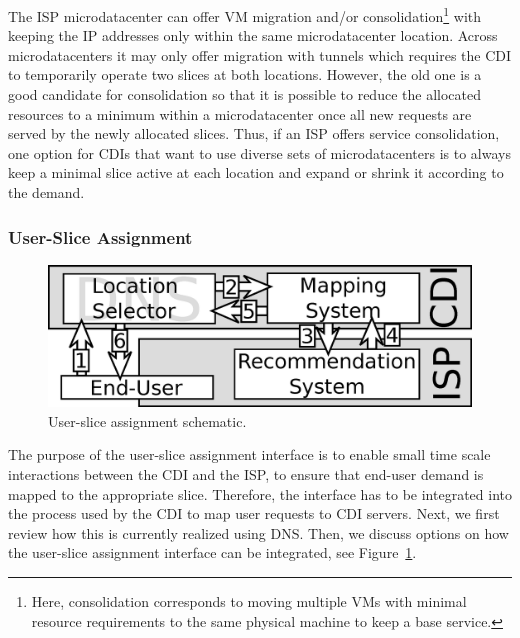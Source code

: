 The ISP microdatacenter can offer VM migration and/or
consolidation\footnote{Here, consolidation corresponds to moving multiple VMs
with minimal resource requirements to the same physical machine to keep a base
service.} with keeping the IP addresses only within the same microdatacenter
location. Across microdatacenters it may only offer migration with tunnels
which requires the CDI to temporarily operate two slices at both locations.
However, the old one is a good candidate for consolidation so that it is
possible to reduce the allocated resources to a minimum within a
microdatacenter once all new requests are served by the newly allocated slices.
Thus, if an ISP offers service consolidation, one option for CDIs that want to
use diverse sets of microdatacenters is to always keep a minimal slice active
at each location and expand or shrink it according to the demand.

\subsubsection{User-Slice Assignment}\label{sec:system-user-assignment}

\begin{figure}[tbp]
    \begin{center}
    \includegraphics[width=0.8\linewidth]{figures/Mapping_System.eps}
    \end{center}
    \vspace*{-1em}
    \caption{User-slice assignment schematic.}
    \label{fig:UserSliceAllocation}
\end{figure}

The purpose of the user-slice assignment interface is to enable small time
scale interactions between the CDI and the ISP, to ensure that end-user demand
is mapped to the appropriate slice.  Therefore, the interface has to be
integrated into the process used by the CDI to map user requests to CDI
servers.  Next, we first review how this is currently realized using DNS. Then,
we discuss options on how the user-slice assignment interface can be
integrated, see Figure~\ref{fig:UserSliceAllocation}.

